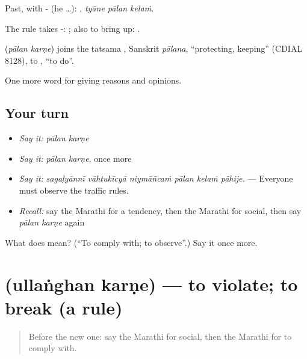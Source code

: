 Past, with - (he …):   , \emph{tyāne pālan kelaṁ}.

The rule takes -:   ; also to bring up:  .

\begin{cousinweb}
\textbf{ } (\emph{pālan karṇe}) joins the tatsama , Sanskrit \emph{pālana}, \textquotedblleft{}protecting, keeping\textquotedblright{} (CDIAL 8128), to , \textquotedblleft{}to do\textquotedblright{}.
\end{cousinweb}

\begin{grammarlens}[title={What you've built}]
One more word for giving reasons and opinions.
\end{grammarlens}

\subsection*{Your turn}
\begin{itemize}
\raggedright
  \item \emph{Say it:} \emph{pālan karṇe}
  \item \emph{Say it:} \emph{pālan karṇe}, once more
  \item \emph{Say it:} \emph{sagaḷyānnī vāhtukīcyā niymāñcaṁ pālan kelaṁ pāhije.} — Everyone must observe the traffic rules.
  \item \emph{Recall:} say the Marathi for a tendency, then the Marathi for social, then say \emph{pālan karṇe} again
\end{itemize}

\begin{tcolorbox}[breakable,colback=teal!4,colframe=teal!35!black,title={Before you move on}]
What does   mean? (\textquotedblleft{}To comply with; to observe\textquotedblright{}.) Say it once more.
\end{tcolorbox}
\section[\texorpdfstring{\mr{उल्लंघन} \mr{करणे} (ullaṅghan karṇe)}{उल्लंघन करणे (ullaṅghan karṇe)}]{  (ullaṅghan karṇe) — to violate; to break (a rule)}

\label{lesson:MR-C368-ullanghan-karne}



\begin{quote}
Before the new one: say the Marathi for social, then the Marathi for to comply with.
\end{quote}

